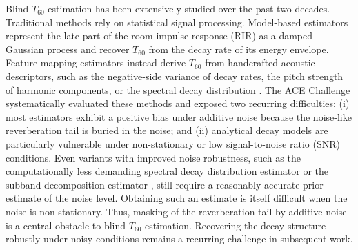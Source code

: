 \documentclass[a4paper,fleqn]{cas-sc}
\begin{document}
Blind $T_{60}$ estimation has been extensively studied over the past two decades. Traditional methods rely on statistical signal processing. Model-based estimators represent the late part of the room impulse response (RIR) as a damped Gaussian process \citep{polack1988these} and recover $T_{60}$ from the decay rate of its energy envelope. Feature-mapping estimators instead derive $T_{60}$ from handcrafted acoustic descriptors, such as the negative-side variance of decay rates, the pitch strength of harmonic components, or the spectral decay distribution \citep{ratnam2003blind,wen2008negativeside,eaton2013sdd,falk2010temporal,lollmann2010iwaenc}. The ACE Challenge systematically evaluated these methods \citep{eaton2016ace} and exposed two recurring difficulties: (i) most estimators exhibit a positive bias under additive noise because the noise-like reverberation tail is buried in the noise; and (ii) analytical decay models are particularly vulnerable under non-stationary or low signal-to-noise ratio (SNR) conditions. Even variants with improved noise robustness, such as the computationally less demanding spectral decay distribution estimator \citep{eaton2013sdd} or the subband decomposition estimator \citep{prego2015subband}, still require a reasonably accurate prior estimate of the noise level. Obtaining such an estimate is itself difficult when the noise is non-stationary. Thus, masking of the reverberation tail by additive noise is a central obstacle to blind $T_{60}$ estimation. Recovering the decay structure robustly under noisy conditions remains a recurring challenge in subsequent work.


\end{document}
